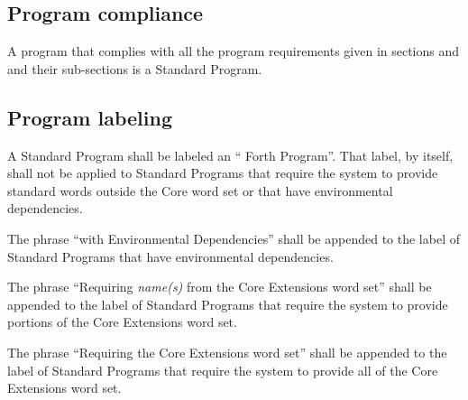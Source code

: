 \subsection{Program compliance} %

A program that complies with all the program requirements given in
sections  and  and their sub-sections is
a Standard Program.

\subsection{Program labeling} %

A Standard Program shall be labeled an `` Forth Program''. That
label, by itself, shall not be applied to Standard Programs that
require the system to provide standard words outside the Core word
set or that have environmental dependencies.

The phrase ``with Environmental Dependencies'' shall be appended to
the label of Standard Programs that have environmental dependencies.

The phrase ``Requiring \emph{name(s)} from the Core Extensions word
set'' shall be appended to the label of Standard Programs that
require the system to provide portions of the Core Extensions word
set.

The phrase ``Requiring the Core Extensions word set'' shall be
appended to the label of Standard Programs that require the system
to provide all of the Core Extensions word set.

